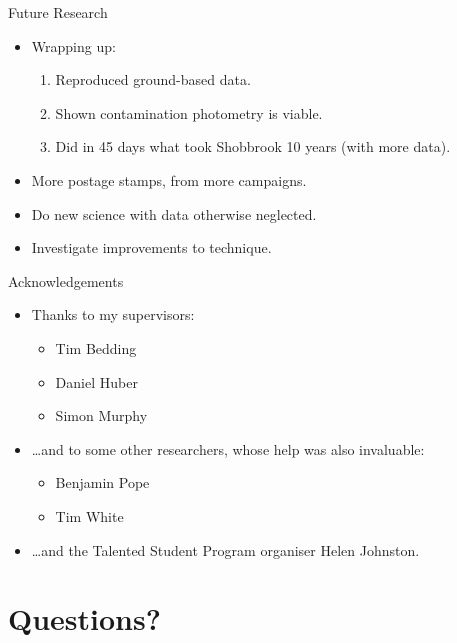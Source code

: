 \documentclass[10pt]{beamer}
\begin{document}
	\begin{frame}{Future Research}
		\begin{itemize}
			\item Wrapping up:
			\begin{enumerate}
				\item Reproduced ground-based data.
				\item Shown contamination photometry is viable.
				\item Did in 45 days what took Shobbrook 10 years (with more data).
			\end{enumerate}
			\item More postage stamps, from more campaigns.
			\item Do new science with data otherwise neglected.
			\item Investigate improvements to technique.
		\end{itemize}
	\end{frame}

	\begin{frame}{Acknowledgements}
		\begin{itemize}
			\item Thanks to my supervisors:
			\begin{itemize}
				\item Tim Bedding
				\item Daniel Huber
				\item Simon Murphy
			\end{itemize}
			\item \dots and to some other researchers, whose help was also invaluable:
			\begin{itemize}
				\item Benjamin Pope
				\item Tim White
			\end{itemize}
			\item \dots and the Talented Student Program organiser Helen Johnston.
		\end{itemize}
	\end{frame}

	\section{Questions?}
\end{document}
